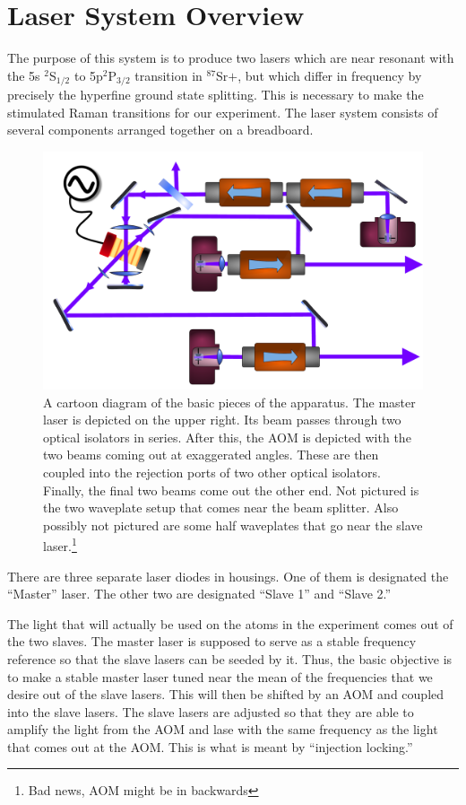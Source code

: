 \chapter{Laser System Overview}


The purpose of this system is to produce two lasers which are near resonant with the 5s $^2$S$_{1/2}$ to 5p$^2$P$_{3/2}$ transition in $^{87}$Sr$+$, but which differ in frequency by precisely the hyperfine ground state splitting. This is necessary to make the stimulated Raman transitions for our experiment. The laser system consists of several components arranged together on a breadboard. 

\begin{figure}
    \centerline{\includegraphics[width=1\textwidth]{diagramOfSetup3}}
    \caption[Diagram of the Setup]{\label{figdiagramOfSetup}
	A cartoon diagram of the basic pieces of the apparatus. The master laser is depicted on the upper right. Its beam passes through two optical isolators in series. After this, the AOM is depicted with the two beams coming out at exaggerated angles. These are then coupled into the rejection ports of two other optical isolators. Finally, the final two beams come out the other end. Not pictured is the two waveplate setup that comes near the beam splitter. Also possibly not pictured are some half waveplates that go near the slave laser.\footnote{Bad news, AOM might be in backwards} 
    }
\end{figure}


There are three separate laser diodes in housings. One of them is designated the ``Master'' laser. The other two are designated ``Slave 1'' and ``Slave 2.'' 

The light that will actually be used on the atoms in the experiment comes out of the two slaves. The master laser is supposed to serve as a stable frequency reference so that the slave lasers can be seeded by it. Thus, the basic objective is to make a stable master laser tuned near the mean of the frequencies that we desire out of the slave lasers. This will then be shifted by an AOM and coupled into the slave lasers. The slave lasers are adjusted so that they are able to amplify the light from the AOM and lase with the same frequency as the light that comes out at the AOM. This is what is meant by ``injection locking.''

